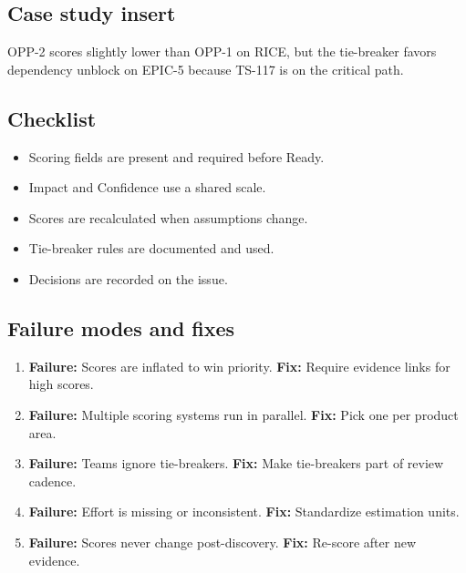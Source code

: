 \subsection{Case study insert}
OPP-2 scores slightly lower than OPP-1 on RICE, but the tie-breaker favors dependency unblock on EPIC-5 because TS-117 is on the critical path.
\subsection{Checklist}
\begin{itemize}
  \item Scoring fields are present and required before Ready.
  \item Impact and Confidence use a shared scale.
  \item Scores are recalculated when assumptions change.
  \item Tie-breaker rules are documented and used.
  \item Decisions are recorded on the issue.
\end{itemize}

\subsection{Failure modes and fixes}
\begin{enumerate}
  \item \textbf{Failure:} Scores are inflated to win priority. \textbf{Fix:} Require evidence links for high scores.
  \item \textbf{Failure:} Multiple scoring systems run in parallel. \textbf{Fix:} Pick one per product area.
  \item \textbf{Failure:} Teams ignore tie-breakers. \textbf{Fix:} Make tie-breakers part of review cadence.
  \item \textbf{Failure:} Effort is missing or inconsistent. \textbf{Fix:} Standardize estimation units.
  \item \textbf{Failure:} Scores never change post-discovery. \textbf{Fix:} Re-score after new evidence.
\end{enumerate}










